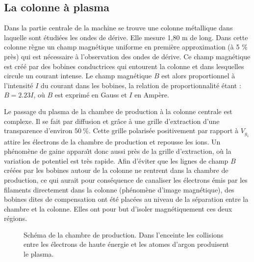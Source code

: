 \documentclass{book}
\begin{document}
\subsection{La colonne \`a plasma}
Dans la partie centrale de la machine se trouve une colonne m\'etallique
dans laquelle sont \'etudi\'ees les ondes de d\'erive.  Elle mesure 1,80
m de long. Dans cette colonne
r\`egne un champ magn\'etique uniforme en premi\`ere approximation
(\`a 5 \% pr\`es) 
qui est n\'ecessaire \`a l'observation des ondes de d\'erive. Ce champ
magn\'etique est cr\'e\'e par des bobines conductrices qui entourent la
colonne et dans lesquelles circule un courant intense. Le champ
magn\'etique $B$ est alors proportionnel \`a l'intensit\'e $I$ du
courant dans les 
bobines, la relation de proportionnalit\'e \'etant : $B=2.23 I$, o\`u $B$
est exprim\'e en Gauss et $I$ en Amp\`ere.

Le passage du plasma de la chambre de production \`a la colonne
centrale est complexe. Il se fait par diffusion et 
gr\^ace \`a une grille d'extraction d'une transparence d'environ $50\ \%$.
Cette grille polaris\'ee positivement par rapport \`a $V_{g_1}$ attire les
\'electrons de la chambre
de production et repousse les ions. Un ph\'enom\`ene de gaine
appara\^\i t donc aussi pr\`es de la grille d'extraction, o\`u la
variation de potentiel est tr\`es rapide.
Afin d'\'eviter que les lignes de champ $B$ cr\'e\'ees par les bobines
autour 
de la colonne ne rentrent dans la chambre de production, ce qui aurait
pour cons\'equence de canaliser les \'electrons \'emis par les filaments
directement dans la colonne (ph\'enom\`ene d'image magn\'etique), des
bobines dites de compensation \cite{Pierre86} ont \'et\'e plac\'ees au
niveau de la 
s\'eparation entre la chambre et la colonne. Elles ont pour but d'isoler
magn\'etiquement ces  deux r\'egions.


%
%
%
\begin{figure}[htb]
 \centerline{}   
 \caption{Sch\'ema de la chambre de production. Dans l'enceinte les
collisions entre les \'electrons de haute \'energie et les atomes
d'argon produisent le plasma.}
 \label{chambre}
\end{figure}
%
\end{document}
